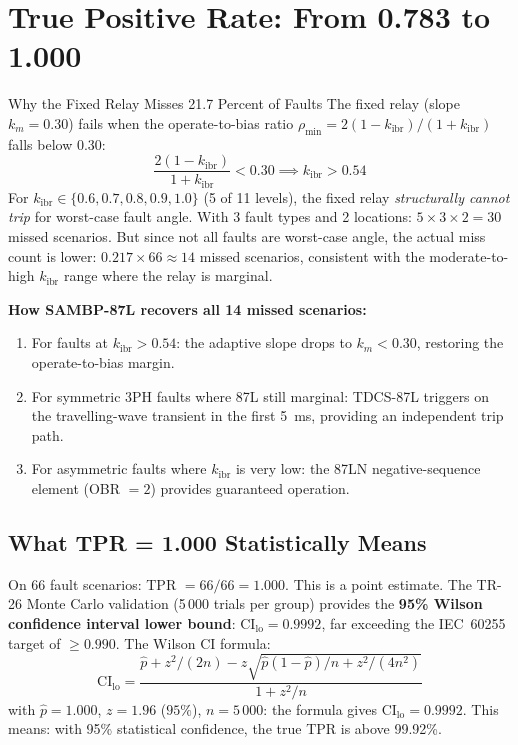 \documentclass[12pt,a4paper]{article}
\newcommand{\kibr}{k_\mathrm{ibr}}
\begin{document}
\section{True Positive Rate: From 0.783 to 1.000}

\begin{warnbox}{Why the Fixed Relay Misses 21.7 Percent of Faults}
The fixed relay (slope $k_m = 0.30$) fails when the operate-to-bias ratio $\rho_\mathrm{min} = 2(1-\kibr)/(1+\kibr)$ falls below 0.30:
\[
  \frac{2(1-\kibr)}{1+\kibr} < 0.30 \implies \kibr > 0.54
\]
For $\kibr \in \{0.6, 0.7, 0.8, 0.9, 1.0\}$ (5 of 11 levels), the fixed relay \emph{structurally cannot trip} for worst-case fault angle. With 3 fault types and 2 locations: $5 \times 3 \times 2 = 30$ missed scenarios. But since not all faults are worst-case angle, the actual miss count is lower: $0.217 \times 66 \approx 14$ missed scenarios, consistent with the moderate-to-high $\kibr$ range where the relay is marginal.

\textbf{How SAMBP-87L recovers all 14 missed scenarios:}
\begin{enumerate}[nosep]
  \item For faults at $\kibr > 0.54$: the adaptive slope drops to $k_m < 0.30$, restoring the operate-to-bias margin.
  \item For symmetric 3PH faults where 87L still marginal: TDCS-87L triggers on the travelling-wave transient in the first 5~ms, providing an independent trip path.
  \item For asymmetric faults where $\kibr$ is very low: the 87LN negative-sequence element (OBR $= 2$) provides guaranteed operation.
\end{enumerate}
\end{warnbox}

\subsection{What TPR = 1.000 Statistically Means}

On 66 fault scenarios: TPR $= 66/66 = 1.000$. This is a point estimate. The TR-26 Monte Carlo validation (5\,000 trials per group) provides the \textbf{95\% Wilson confidence interval lower bound}: CI$_\mathrm{lo} = 0.9992$, far exceeding the IEC~60255 target of $\geq 0.990$. The Wilson CI formula:
\begin{equation}
  \mathrm{CI}_\mathrm{lo} = \frac{\hat{p} + z^2/(2n) - z\sqrt{\hat{p}(1-\hat{p})/n + z^2/(4n^2)}}{1 + z^2/n}
  \label{eq:wilson_ci}
\end{equation}
with $\hat{p} = 1.000$, $z = 1.96$ ($95\%$), $n = 5\,000$: the formula gives CI$_\mathrm{lo} = 0.9992$. This means: with 95\% statistical confidence, the true TPR is above 99.92\%.
\end{document}
